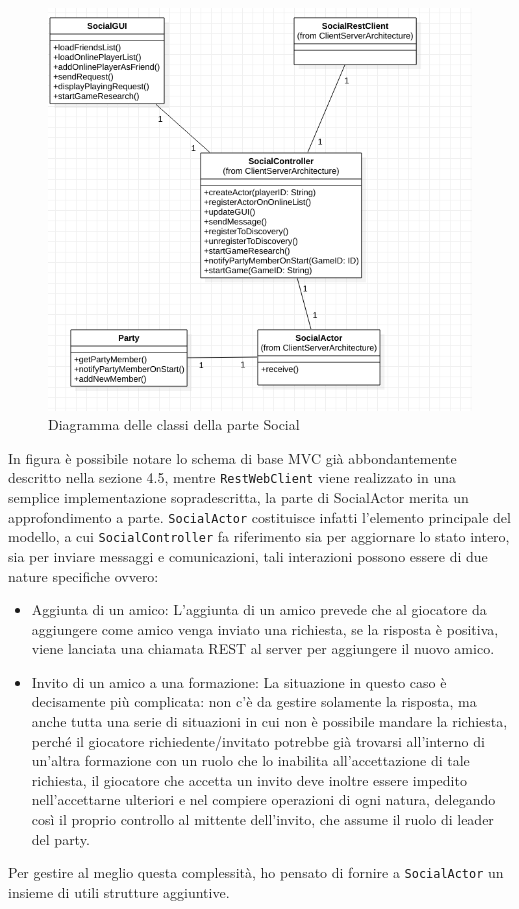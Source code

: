 \begin{figure}[H]
	\includegraphics[width=\textwidth,height=\textheight,keepaspectratio]{socialArchitecture}
	\caption{Diagramma delle classi della parte Social}
\end{figure}

In figura è possibile notare lo schema di base MVC già abbondantemente descritto nella sezione 4.5, mentre \texttt{RestWebClient} viene realizzato in una semplice implementazione sopradescritta, la parte di SocialActor merita un approfondimento a parte.
\texttt{SocialActor} costituisce infatti l'elemento principale del modello, a cui \texttt{SocialController} fa riferimento sia per aggiornare lo stato intero, sia per inviare messaggi e comunicazioni, tali interazioni possono essere di due nature specifiche ovvero:
\begin{itemize}
	\item Aggiunta di un amico: L'aggiunta di un amico prevede che al giocatore da aggiungere come amico venga inviato una richiesta, se la risposta è positiva, viene lanciata una chiamata REST al server per aggiungere il nuovo amico.
	\item Invito di un amico a una formazione: La situazione in questo caso è decisamente più complicata: non c'è da gestire solamente la risposta, ma anche tutta una serie di situazioni in cui non è possibile mandare la richiesta, perché il giocatore richiedente/invitato potrebbe già trovarsi all'interno di un'altra formazione con un ruolo che lo inabilita all'accettazione di tale richiesta, il giocatore che accetta un invito deve inoltre essere impedito nell'accettarne ulteriori e nel compiere operazioni di ogni natura, delegando così il proprio controllo al mittente dell'invito, che assume il ruolo di leader del party.
\end{itemize}
Per gestire al meglio questa complessità, ho pensato di fornire a \texttt{SocialActor} un insieme di utili strutture aggiuntive.

